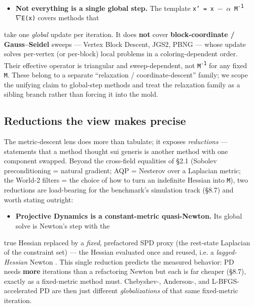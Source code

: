\documentclass{egpubl}
\begin{document}
\begin{itemize}
  \item \textbf{Not everything is a single global step.} The template \texttt{x' = x $-$ $\alpha$ M\textsuperscript{-1} $\nabla$E(x)} covers methods that
\end{itemize}
  take one \emph{global} update per iteration. It does \textbf{not} cover \textbf{block-coordinate / Gauss--Seidel}
  sweeps --- Vertex Block Descent, JGS2, PBNG --- whose update solves per-vertex (or per-block) local
  problems in a coloring-dependent order. Their effective operator is triangular and sweep-dependent,
  not \texttt{M\textsuperscript{-1}} for any fixed \texttt{M}. These belong to a separate ``relaxation / coordinate-descent'' family;
  we scope the unifying claim to global-step methods and treat the relaxation family as a sibling
  branch rather than forcing it into the mold.

\subsection{Reductions the view makes precise}

The metric-descent lens does more than tabulate; it exposes \emph{reductions} --- statements that a method
thought sui generis is another method with one component swapped. Beyond the cross-field equalities of
\S2.1 (Sobolev preconditioning = natural gradient; AQP = Nesterov over a Laplacian metric; the World-2
filters = the choice of how to turn an indefinite Hessian into \texttt{M}), two reductions are load-bearing
for the benchmark's simulation track (\S8.7) and worth stating outright:

\begin{itemize}
  \item \textbf{Projective Dynamics is a constant-metric quasi-Newton.} Its global solve is Newton's step with the
\end{itemize}
  true Hessian replaced by a \emph{fixed}, prefactored SPD proxy (the rest-state Laplacian of the
  constraint set) --- the Hessian evaluated once and reused, i.e. a \emph{lagged-Hessian} Newton
  \cite{quasi-newton-liu2017}. This single reduction predicts the measured behavior: PD needs \textbf{more}
  iterations than a refactoring Newton but each is far cheaper (\S8.7), exactly as a fixed-metric method
  must. Chebyshev-, Anderson-, and L-BFGS-accelerated PD are then just different \emph{globalizations} of
  that same fixed-metric iteration.
\end{document}
